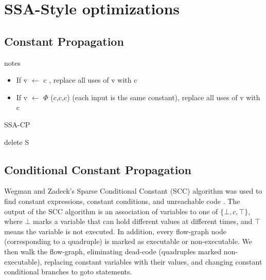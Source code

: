 \newpage

\section{SSA-Style optimizations}

\subsection{Constant Propagation}
\begin{note}{notes}
	\begin{itemize}
		\item If  v $\gets$ c , replace all uses of v with c
		\item If  v $\gets$  $\Phi$ (c,c,c)  (each input is the same constant), replace all uses of v with c
	\end{itemize}
\end{note}


\begin{algorithm}
	\caption{SSA-CP}\label{alg:SSA-CP}
	\begin{algorithmic}

		\State delete S
		\EndFor
		\EndIf
		\EndWhile

	\end{algorithmic}
\end{algorithm}

\subsection{Conditional Constant Propagation }

Wegman and Zadeck's Sparse Conditional Constant (SCC) algorithm was used to find constant expressions, 
constant conditions, and unreachable code \cite{wegman1991constant}. The output of the SCC algorithm is an association of variables to one of $\lbrace \bot, c, \top \rbrace$, where $\bot$ marks a variable that can hold different values at different times, and $\top$ means the variable is not executed. In addition, every flow-graph node (corresponding to a quadruple) is marked as executable or non-executable. We then walk the flow-graph, eliminating dead-code (quadruples marked non-executable), replacing constant variables with their values, and changing constant conditional branches to goto statements.

